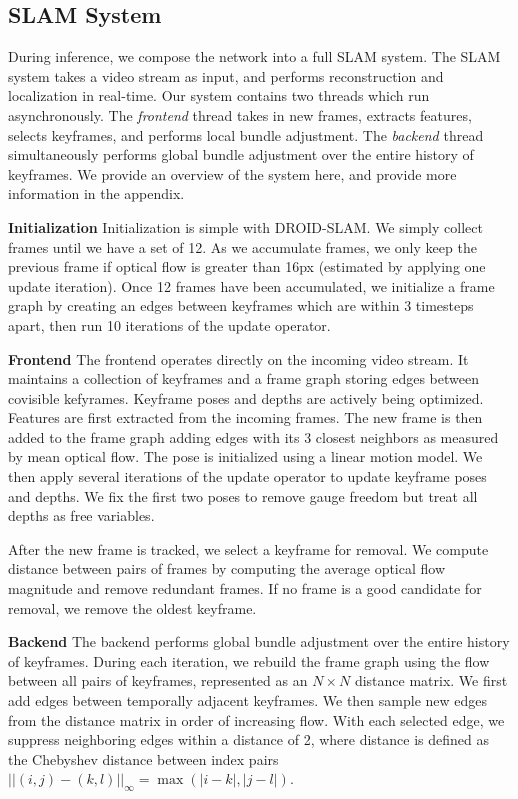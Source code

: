 \documentclass{article}
\newcommand{\methodname}{DROID-SLAM}
\begin{document}
\vspace{-1mm}
\subsection{SLAM System}
\label{sec:system}
\vspace{-1mm}
During inference, we compose the network into a full SLAM system. The SLAM system takes a video stream as input, and performs reconstruction and localization in real-time. Our system contains two threads which run asynchronously. The \emph{frontend} thread takes in new frames, extracts features, selects keyframes, and performs local bundle adjustment. The \emph{backend} thread simultaneously performs global bundle adjustment over the entire history of keyframes. We provide an overview of the system here, and provide more information in the appendix.

\noindent \textbf{Initialization} Initialization is simple with \methodname{}. We simply collect frames until we have a set of 12. As we accumulate frames, we only keep the previous frame if optical flow is greater than 16px (estimated by applying one update iteration). Once 12 frames have been accumulated, we initialize a frame graph by creating an edges between keyframes which are within 3 timesteps apart, then run 10 iterations of the update operator.

\noindent \textbf{Frontend} The frontend operates directly on the incoming video stream. It maintains a collection of keyframes and a frame graph storing edges between covisible kefyrames. Keyframe poses and depths are actively being optimized. Features are first extracted from the incoming frames. The new frame is then added to the frame graph adding edges with its 3 closest neighbors as measured by mean optical flow. The pose is initialized using a linear motion model. We then apply several iterations of the update operator to update keyframe poses and depths. We fix the first two poses to remove gauge freedom but treat all depths as free variables.

After the new frame is tracked, we select a keyframe for removal. We compute distance between pairs of frames by computing the average optical flow magnitude and remove redundant frames. If no frame is a good candidate for removal, we remove the oldest keyframe.

\noindent \textbf{Backend} The backend performs global bundle adjustment over the entire history of keyframes. During each iteration, we rebuild the frame graph using the flow between all pairs of keyframes, represented as an $N\times N$ distance matrix. We first add edges between temporally adjacent keyframes. We then sample new edges from the distance matrix in order of increasing flow. With each selected edge, we suppress neighboring edges within a distance of 2, where distance is defined as the Chebyshev distance between index pairs $||(i,j) - (k,l)||_\infty = \max(|i-k|, |j-l|)$.
\end{document}

